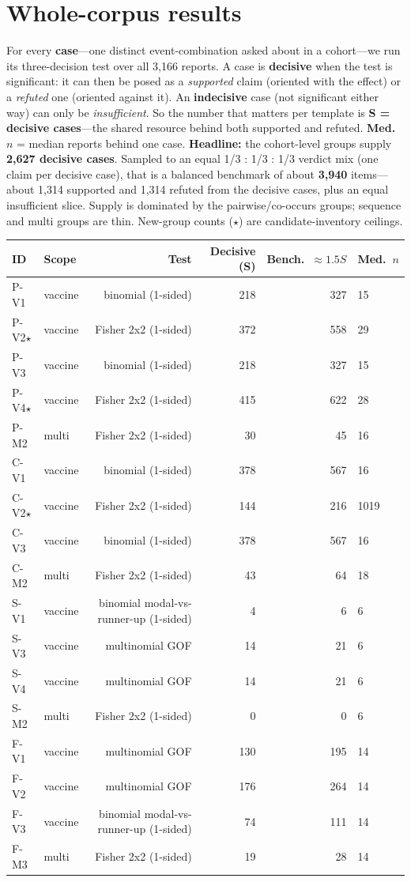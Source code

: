 \documentclass[11pt]{article}
\begin{document}
\section*{Whole-corpus results}
For every \textbf{case}---one distinct event-combination asked about in a cohort---we run its three-decision test over all 3{,}166 reports. A case is \textbf{decisive} when the test is significant: it can then be posed as a \emph{supported} claim (oriented with the effect) or a \emph{refuted} one (oriented against it). An \textbf{indecisive} case (not significant either way) can only be \emph{insufficient}. So the number that matters per template is \textbf{S = decisive cases}---the shared resource behind both supported and refuted. \textbf{Med.\ $n$} = median reports behind one case.
\medskip\noindent\textbf{Headline:} the cohort-level groups supply \textbf{2,627 decisive cases}. Sampled to an equal 1/3 : 1/3 : 1/3 verdict mix (one claim per decisive case), that is a balanced benchmark of about \textbf{3,940} items---about 1,314 supported and 1,314 refuted from the decisive cases, plus an equal insufficient slice. Supply is dominated by the pairwise/co-occurs groups; sequence and multi groups are thin. New-group counts ($\star$) are candidate-inventory ceilings.
\medskip\noindent\begin{tabularx}{\linewidth}{llRrr}
\toprule
\textbf{ID} & \textbf{Scope} & \textbf{Test} & \textbf{Decisive (S)} & \textbf{Bench.\ ${\approx}1.5S$} & \textbf{Med.\ $n$} \\
\midrule
P-V1 & vaccine & binomial (1-sided) & 218 & 327 & 15 \\
P-V2$\star$ & vaccine & Fisher 2x2 (1-sided) & 372 & 558 & 29 \\
P-V3 & vaccine & binomial (1-sided) & 218 & 327 & 15 \\
P-V4$\star$ & vaccine & Fisher 2x2 (1-sided) & 415 & 622 & 28 \\
P-M2 & multi & Fisher 2x2 (1-sided) & 30 & 45 & 16 \\
C-V1 & vaccine & binomial (1-sided) & 378 & 567 & 16 \\
C-V2$\star$ & vaccine & Fisher 2x2 (1-sided) & 144 & 216 & 1019 \\
C-V3 & vaccine & binomial (1-sided) & 378 & 567 & 16 \\
C-M2 & multi & Fisher 2x2 (1-sided) & 43 & 64 & 18 \\
S-V1 & vaccine & binomial modal-vs-runner-up (1-sided) & 4 & 6 & 6 \\
S-V3 & vaccine & multinomial GOF & 14 & 21 & 6 \\
S-V4 & vaccine & multinomial GOF & 14 & 21 & 6 \\
S-M2 & multi & Fisher 2x2 (1-sided) & 0 & 0 & 6 \\
F-V1 & vaccine & multinomial GOF & 130 & 195 & 14 \\
F-V2 & vaccine & multinomial GOF & 176 & 264 & 14 \\
F-V3 & vaccine & binomial modal-vs-runner-up (1-sided) & 74 & 111 & 14 \\
F-M3 & multi & Fisher 2x2 (1-sided) & 19 & 28 & 14 \\
\bottomrule
\end{tabularx}
\end{document}
